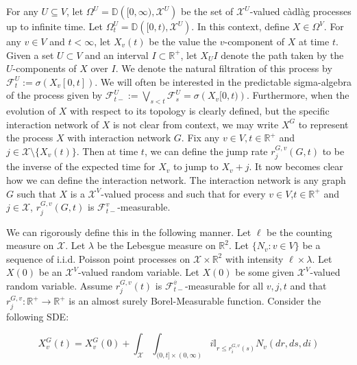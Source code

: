 \documentclass[12pt]{article}
\newcommand{\mb}{\mathbb}
\newcommand{\mc}{\mathcal}
\newcommand{\ra}{\rightarrow}
\newcommand{\ov}{\overline}
\newcommand{\ind}{\hspace{24pt}}
\newcommand{\defeq}{:=}								%
\newcommand{\cad}{\mb{D}}							%
\newcommand{\sta}{\mc{X}}							%
\newcommand{\cl}[1]{\ov{#1}}						%
\newcommand{\Xf}{X}									%
\newcommand{\poiss}{N}								%
\newcommand{\leb}{\lambda}							%
\newcommand{\Sm}{\ell}								%
\newcommand{\rate}{r}								%
\newcommand{\F}{\mc{F}}								%
\newcommand{\poissv}[1]{_{#1}}						%
\newcommand{\vind}[1]{_{#1}}						%
\newcommand{\tme}[1]{(#1)}							%
\newcommand{\tmi}[1]{#1}							%
\newcommand{\gind}[1]{^{#1}}						%
\newcommand{\vpara}[1]{^{#1}}						%
\newcommand{\stpara}[1]{_{#1}}						%
\newcommand{\tpara}[1]{_{#1}}						%
\newcommand{\gvpara}[2]{^{#1,#2}}					%
\begin{document}
For any \(U \subseteq V\), let \(\Omega\vpara{U} = \cad\left([0,\infty),\sta^U\right)\) be the set of \(\sta^U\)-valued c\`adl\`ag processes up to infinite time. Let \(\Omega\vpara{U}\tpara{t} = \cad\left([0,t),\sta^U\right)\). In this context, define \(\Xf \in \Omega\vpara{V}\). For any \(v \in V\) and \(t < \infty\), let \(\Xf\vind{v}\tme{t}\) be the value the \(v\)-component of \(\Xf\) at time \(t\). Given a set \(U\subset V\) and an interval \(I \subset \mb{R}^+\), let \(\Xf\vind{U}\tmi{I}\) denote the path taken by the \(U\)-components of \(\Xf\) over \(\tmi{I}\). We denote the natural filtration of this process by \(\F\vpara{U}\tpara{t} \defeq \sigma \left(\Xf\vind{v}\tmi{[0,t]}\right)\). We will often be interested in the predictable sigma-algebra of the process given by \(\F\vpara{U}\tpara{t-} \defeq \bigvee_{s < t} \F\vpara{U}\tpara{s} = \sigma\left(\Xf\vind{v}\tmi{[0,t)}\right)\). Furthermore, when the evolution of \(\Xf\) with respect to its topology is clearly defined, but the specific interaction network of \(\Xf\) is not clear from context, we may write \(\Xf\gind{G}\) to represent the process \(\Xf\) with interaction network \(G\). Fix any \(v \in V,t \in \mb{R}^+\) and \(j \in \sta\setminus\{\Xf\vind{v}\tme{t}\}\). Then at time \(t\), we can define the jump rate \(\rate\gvpara{G}{v}\stpara{j}(G,t)\) to be the inverse of the expected time for \(\Xf\vind{v}\) to jump to \(\Xf\vind{v} + j\). It now becomes clear how we can define the interaction network. The interaction network is any graph \(G\) such that \(\Xf\) is a \(\sta^V\)-valued process and such that for every \(v \in V\),\(t\in \mb{R}^+\) and \(j \in \sta\), \(\rate\gvpara{G}{v}\stpara{j}(G,t)\) is \(\F\vpara{v}\tpara{t-}\)-measurable. 

\ind We can rigorously define this in the following manner. Let \(\Sm\) be the counting measure on \(\sta\). Let \(\leb\) be the Lebesgue measure on \(\mb{R}^2\). Let \(\{\poiss\poissv{v}:v \in V\}\) be a sequence of i.i.d. Poisson point processes on \(\sta\times \mb{R}^2\) with intensity \(\Sm\times \leb\). Let \(\Xf\tme{0}\) be an \(\sta^V\)-valued random variable. Let \(\Xf\tme{0}\) be some given \(\sta^V\)-valued random variable. Assume \(\rate\gvpara{G}{v}\stpara{j}(t)\) is \(\F\vpara{\cl{v}}\tpara{t-}\)-measurable for all \(v,j,t\) and that \(\rate\gvpara{G}{v}\stpara{j}:\mb{R}^+ \ra\mb{R}^+\) is an almost surely Borel-Measurable function. Consider the following SDE:

\begin{equation}
\Xf\gind{G}\vind{v}\tme{t} = \Xf\gind{G}\vind{v}\tme{0} + \int_{\sta}\int_{(0,t]\times (0,\infty)} i\mb{I}_{r \leq \rate\gvpara{G}{v}\stpara{i}(s)} \poiss\poissv{v}\left(dr,ds,di\right)
\label{p::Xf}
\end{equation}
\end{document}
